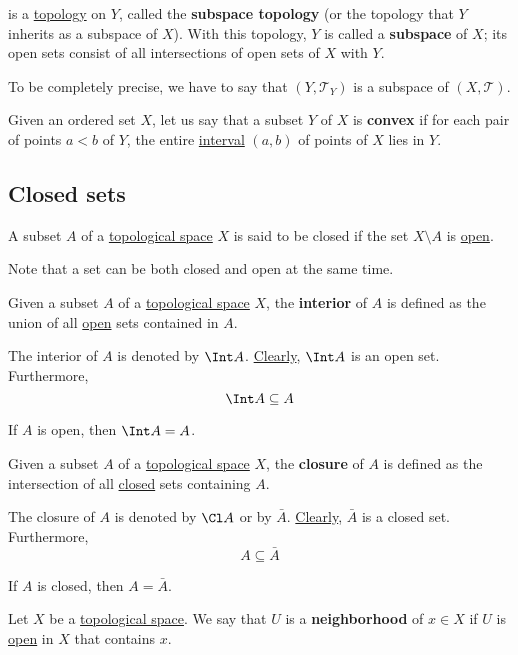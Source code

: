 is a \href{cc8eb8b}{topology} on $Y$, called the \textbf{subspace topology} (or
the topology that $Y$ inherits as a subspace of $X$). With this topology, $Y$
is called a \textbf{subspace} of $X$; its open sets consist of all
intersections of open sets of $X$ with $Y$.

To be completely precise, we have to say that $(Y,\mathcal T_Y)$ is a subspace
of $(X,\mathcal T)$.

\label{c19c232}

Given an ordered set $X$, let us say that a subset $Y$ of $X$ is
\textbf{convex} if for each pair of points $a<b$ of $Y$, the entire
\href{c65e94a}{interval} $(a,b)$ of points of $X$ lies in $Y$.

\subsection{Closed sets}\label{b65da14}

\label{dd23fec}

A subset $A$ of a \href{de3c1b1}{topological space} $X$ is said to be closed if
the set $X\setminus A$ is \href{c4490f8}{open}.

Note that a set can be both closed and open at the same time.

\label{c15654b}

Given a subset $A$ of a \href{de3c1b1}{topological space} $X$, the
\textbf{interior} of $A$ is defined as the union of all \href{c4490f8}{open}
sets contained in $A$.

The interior of $A$ is denoted by $\Int A$. \href{cc8eb8b}{Clearly}, $\Int A$
is an open set. Furthermore,
$$
  \Int A\subseteq A
$$

If $A$ is open, then $\Int A=A$.

\label{abdd5f2}

Given a subset $A$ of a \href{de3c1b1}{topological space} $X$, the
\textbf{closure} of $A$ is defined as the intersection of all
\href{dd23fec}{closed} sets containing $A$.

The closure of $A$ is denoted by $\Cl A$ or by $\bar A$.
\href{e48d738}{Clearly}, $\bar A$ is a closed set. Furthermore,
$$
  A\subseteq\bar A
$$

If $A$ is closed, then $A=\bar A$.

\label{de512d5}

Let $X$ be a \href{de3c1b1}{topological space}. We say that $U$ is a
\textbf{neighborhood} of $x\in X$ if $U$ is \href{c4490f8}{open} in $X$ that
contains $x$.

